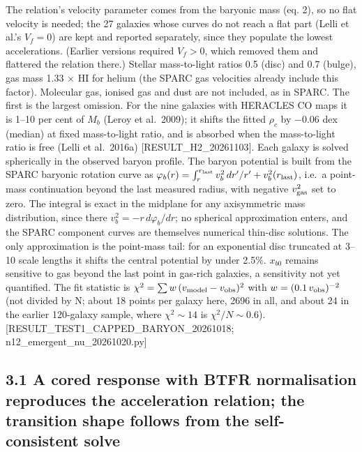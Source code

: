 \documentclass[
  10pt,
]{article}
\begin{document}
The relation's velocity parameter comes from the baryonic mass (eq. 2), so no flat velocity is needed; the 27 galaxies whose curves do not reach a flat part (Lelli et al.'s $V_f=0$) are kept and reported separately, since they populate the lowest accelerations. (Earlier versions required $V_f>0$, which removed them and flattered the relation there.) Stellar mass-to-light ratios 0.5 (disc) and 0.7 (bulge), gas mass 1.33 $\times$ HI for helium (the SPARC gas velocities already include this factor). Molecular gas, ionised gas and dust are not included, as in SPARC. The first is the largest omission. For the nine galaxies with HERACLES CO maps it is 1--10 per cent of $M_b$ (Leroy et al.~2009); it shifts the fitted $\rho_c$ by $-0.06$ dex (median) at fixed mass-to-light ratio, and is absorbed when the mass-to-light ratio is free (Lelli et al.~2016a) {[}RESULT\_H2\_20261103{]}. Each galaxy is solved spherically in the observed baryon profile. The baryon potential is built from the SPARC baryonic rotation curve as $\varphi_b(r)=\int_r^{r_{\rm last}}v_b^2\,dr'/r'+v_b^2(r_{\rm last})$, i.e.\ a point-mass continuation beyond the last measured radius, with negative $v_{\rm gas}^2$ set to zero. The integral is exact in the midplane for any axisymmetric mass distribution, since there $v_b^2=-r\,d\varphi_b/dr$; no spherical approximation enters, and the SPARC component curves are themselves numerical thin-disc solutions. The only approximation is the point-mass tail: for an exponential disc truncated at 3--10 scale lengths it shifts the central potential by under 2.5\%. $x_{b0}$ remains sensitive to gas beyond the last point in gas-rich galaxies, a sensitivity not yet quantified. The fit statistic is $\chi^2=\sum w\,(v_{\rm model}-v_{\rm obs})^2$ with $w=(0.1\,v_{\rm obs})^{-2}$ (not divided by N; about 18 points per galaxy here, 2696 in all, and about 24 in the earlier 120-galaxy sample, where $\chi^2\sim 14$ is $\chi^2/N\sim 0.6$). {[}RESULT\_TEST1\_CAPPED\_BARYON\_20261018; n12\_emergent\_nu\_20261020.py{]}

\subsection{3.1 A cored response with BTFR normalisation reproduces the acceleration relation; the transition shape follows from the self-consistent solve}\label{a-cored-isothermal-response-with-btfr-normalisation-reproduces-the-acceleration-relation-the-transition-shape-is-the-output}
\end{document}
